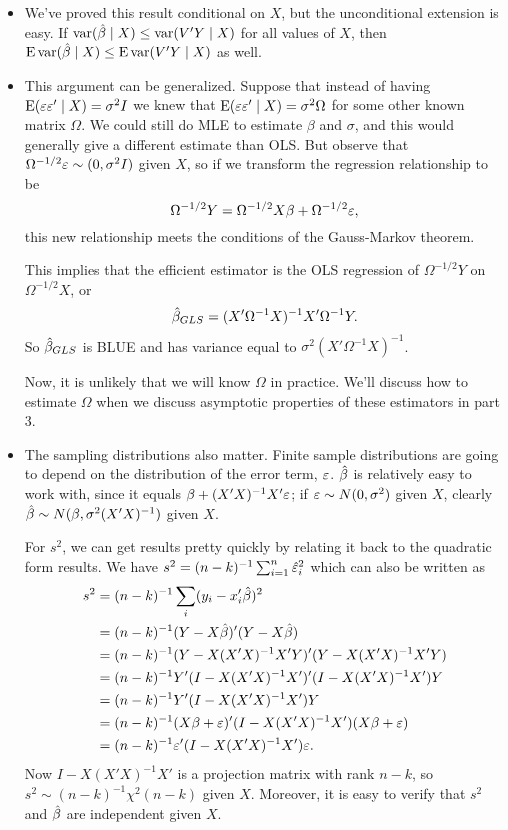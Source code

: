 \begin{itemize}[leftmargin=0pt]
\item We've proved this result conditional on $X$, but the
  unconditional extension is easy.  If $\operatorname{var}(\hat{\beta} \mid X) \leq \operatorname{var}(V'Y \mid X)$
  for all values of $X$, then $\operatorname{E} \operatorname{var}(\hat{\beta} \mid X) \leq \operatorname{E} \operatorname{var}(V'Y \mid X)$ as
  well.

\item This argument can be generalized.  Suppose that instead of
  having $\operatorname{E}(\varepsilon \varepsilon' \mid X) = \sigma^2 I$ we knew that $\operatorname{E}(\varepsilon \varepsilon' \mid X) = \sigma^2
  \Omega$ for some other known matrix $\Omega$.  We could still do MLE to
  estimate $\beta$ and $\sigma$, and this would generally give a different
  estimate than OLS.  But observe that $\Omega^{-1/2} \varepsilon \sim (0, \sigma^2 I)$ given
  $X$, so if we transform the regression relationship to be
  \begin{equation*}
    \Omega^{-1/2} Y = \Omega^{-1/2} X \beta + \Omega^{-1/2} \varepsilon,
  \end{equation*}
  this new relationship meets the conditions of the Gauss-Markov
  theorem.

  This implies that the efficient estimator is the OLS regression of
  $\Omega^{-1/2} Y$ on $\Omega^{-1/2} X$, or
  \begin{equation*}
    \hat{\beta}_{GLS} = (X'\Omega^{-1}X)^{-1}X'\Omega^{-1}Y.
  \end{equation*}
  So $\hat{\beta}_{GLS}$ is BLUE and has variance equal to $\sigma^2 (X' \Omega^{-1}
  X)^{-1}$.

  Now, it is unlikely that we will know $\Omega$ in practice.  We'll
  discuss how to estimate $\Omega$ when we discuss asymptotic properties of
  these estimators in part 3.

\item The sampling distributions also matter.  Finite sample
  distributions are going to depend on the distribution of the error
  term, $\varepsilon$.  $\hat{\beta}$ is relatively easy to work with, since it equals
  $\beta + (X'X)^{-1} X'\varepsilon$; if $\varepsilon \sim N(0, \sigma^2)$ given $X$, clearly
  $\hat{\beta} \sim N(\beta, \sigma^2(X'X)^{-1})$ given $X$.

  For $s^2$, we can get results pretty quickly by relating it back to
  the quadratic form results. We have $s^2 = (n-k)^{-1} \sum_{i=1}^n \hat{\varepsilon}^2_i$
  which can also be written as
  \begin{align*}
    s^2 &= (n-k)^{-1} \sum_i (y_i - x_i'\hat{\beta})^2 \\
    &= (n-k)^{-1} (Y - X\hat{\beta})'(Y - X\hat{\beta}) \\
    &= (n-k)^{-1} (Y - X(X'X)^{-1}X'Y)'(Y - X(X'X)^{-1}X'Y) \\
    &= (n-k)^{-1} Y'(I - X(X'X)^{-1}X')'(I - X(X'X)^{-1}X')Y \\
    &= (n-k)^{-1} Y'(I - X(X'X)^{-1}X')Y \\
    &= (n-k)^{-1} (X\beta + \varepsilon)'(I - X(X'X)^{-1}X')(X\beta + \varepsilon) \\
    &= (n-k)^{-1} \varepsilon'(I - X(X'X)^{-1}X')\varepsilon.
  \end{align*}
  Now $I - X(X'X)^{-1}X'$ is a projection matrix with rank $n-k$, so
  $s^2 \sim (n-k)^{-1} \chi^2(n-k)$ given $X$.  Moreover, it is easy to verify
  that $s^2$ and $\hat{\beta}$ are independent given $X$.


\end{itemize}
